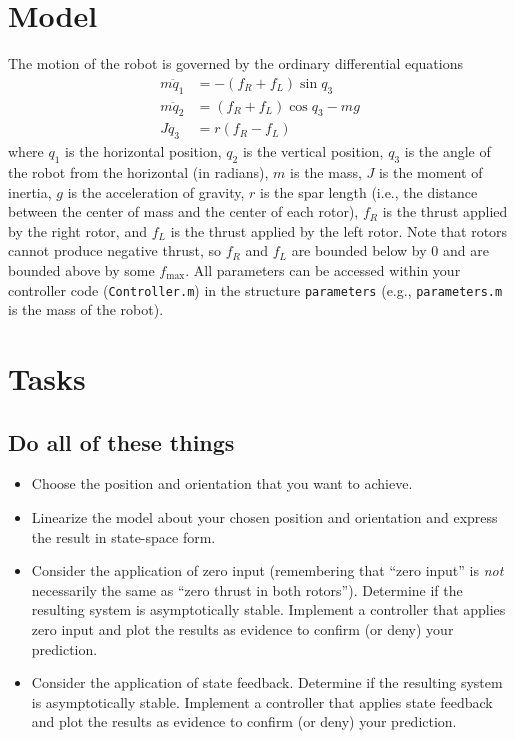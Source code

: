 \documentclass[conf]{new-aiaa}
\begin{document}
\section{Model}

The motion of the robot is governed by the ordinary differential equations
\begin{align*}
m \ddot{q}_{1} &= -(f_{R} + f_{L}) \sin q_{3} \\
m \ddot{q}_{2} &= (f_{R} + f_{L}) \cos q_{3} - mg \\
J \ddot{q}_{3} &= r (f_{R} - f_{L})
\end{align*}
where $q_{1}$ is the horizontal position, $q_{2}$ is the vertical position, $q_{3}$ is the angle of the robot from the horizontal (in radians), $m$ is the mass, $J$ is the moment of inertia, $g$ is the acceleration of gravity, $r$ is the spar length (i.e., the distance between the center of mass and the center of each rotor), $f_{R}$ is the thrust applied by the right rotor, and $f_{L}$ is the thrust applied by the left rotor. Note that rotors cannot produce negative thrust, so $f_{R}$ and $f_{L}$ are bounded below by 0 and are bounded above by some $f_\text{max}$. All parameters can be accessed within your controller code (\lstinline|Controller.m|) in the structure \lstinline|parameters| (e.g., \lstinline|parameters.m| is the mass of the robot).


\section{Tasks}

\subsection{Do all of these things}

\begin{itemize}

\item Choose the position and orientation that you want to achieve.
\item Linearize the model about your chosen position and orientation and express the result in state-space form.
\item Consider the application of zero input (remembering that ``zero input'' is {\em not} necessarily the same as ``zero thrust in both rotors''). Determine if the resulting system is asymptotically stable. Implement a controller that applies zero input and plot the results as evidence to confirm (or deny) your prediction.
\item Consider the application of state feedback. Determine if the resulting system is asymptotically stable. Implement a controller that applies state feedback and plot the results as evidence to confirm (or deny) your prediction.

\end{itemize}
\end{document}
